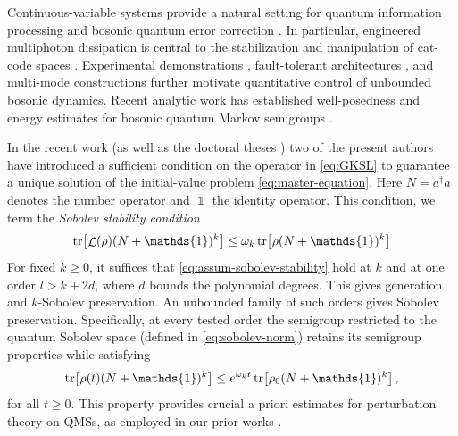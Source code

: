 \documentclass[11pt]{article}
\theoremstyle{myplain}
\theoremstyle{mydefinition}
\theoremstyle{remark}
\DeclareMathOperator{\cL}{\mathcal{L}}
\DeclareMathOperator{\1}{\mathds{1}}
\newcommand{\tr}[1][]{\operatorname{tr}%
  \ifx#1\empty \else \left[ #1 \right] \fi}
\begin{document}
    Continuous-variable systems provide a natural setting for quantum information processing \cite{Braunstein.2005} and bosonic quantum error correction \cite{Gottesman.2001,Joshi.2021}. In particular, engineered multiphoton dissipation is central to the stabilization and manipulation of cat-code spaces \cite{Mirrahimi.2014,Leghtas.2015,Azouit.2016,Guillaud.2023}. Experimental demonstrations \cite{Ofek.2016,Rosenblum.2018}, fault-tolerant architectures \cite{Chamberland.2022}, and multi-mode constructions \cite{Jain.2024} further motivate quantitative control of unbounded bosonic dynamics. Recent analytic work has established well-posedness and energy estimates for bosonic quantum Markov semigroups \cite{Agredo.2021,Gondolf.2024}.
    
    In the recent work \cite{Gondolf.2024} (as well as the doctoral theses \cite{Moebus.2025thesis,Gondolf.2025thesis}) two of the present authors have introduced a sufficient condition on the operator in \eqref{eq:GKSL} to guarantee a unique solution of the initial-value problem \eqref{eq:master-equation}. Here $N=a^\dagger a$ denotes the number operator and $\1$ the identity operator. This condition, we term the \emph{Sobolev stability condition}
    \begin{equation}\label{eq:assum-sobolev-stability}
        \tr\bigl[\cL(\rho)(N + \1)^{k}\bigr] \leq \omega_{k} \tr\bigl[\rho(N + \1)^{k}\bigr]
    \end{equation}
    For fixed $k\geq0$, it suffices that \eqref{eq:assum-sobolev-stability} hold at $k$ and at one order $l>k+2d$, where $d$ bounds the polynomial degrees. This gives generation and $k$-Sobolev preservation. An unbounded family of such orders gives Sobolev preservation. Specifically, at every tested order the semigroup restricted to the quantum Sobolev space (defined in \eqref{eq:sobolev-norm}) retains its semigroup properties while satisfying
    \begin{equation*}
        \tr\bigl[\rho(t)(N + \1)^{k}\bigr] \leq e^{\omega_k t}\tr\bigl[\rho_0(N + \1)^{k}\bigr]\,,
    \end{equation*}
    for all $t\geq0$. This property provides crucial a priori estimates for perturbation theory on QMSs, as employed in our prior works \cite{Moebus.2024,Moebus.2026Zeno,Moebus.2024Learning,Moebus.2025}. 
    
\end{document}
